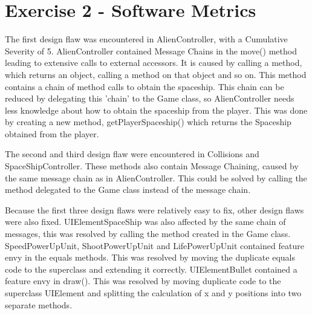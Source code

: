 \documentclass[10pt]{article}
\begin{document}
\section{Exercise 2 - Software Metrics }

The first design flaw was encountered in AlienController, with a Cumulative Severity of 5. 
AlienController contained Message Chains in the move() method leading to extensive calls to external accessors. It is caused by calling a method, which returns an object, calling a method on that object and so on. This method contains a chain of method calls to obtain the spaceship. This chain can be reduced by delegating this 'chain' to the Game class, so AlienController needs less knowledge about how to obtain the spaceship from the player. This was done by creating a new method, getPlayerSpaceship() which returns the Spaceship obtained from the player.

The second and third design flaw were encountered in Collisions and SpaceShipController. These methods also contain Message Chaining, caused by the same message chain as in AlienController. This could be solved by calling the method delegated to the Game class instead of the message chain.

Because the first three design flaws were relatively easy to fix, other design flaws were also fixed. 
UIElementSpaceShip was also affected by the same chain of messages, this was resolved by calling the method created in the Game class. SpeedPowerUpUnit, ShootPowerUpUnit and LifePowerUpUnit contained feature envy in the equals methods. This was resolved by moving the duplicate equals code to the superclass and extending it correctly. UIElementBullet contained a feature envy in draw(). This was resolved by moving duplicate code to the superclass UIElement and splitting the calculation of x and y positions into two separate methods. 
\end{document}
